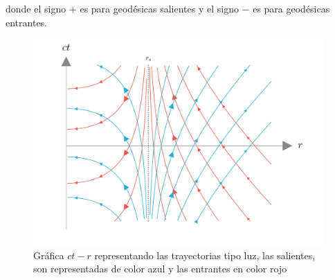 donde el signo $+$ es para geodésicas salientes y el signo $-$ es para geodésicas entrantes.
\begin{figure}[H]
    \begin{small}
        \begin{center}
            \includegraphics[width=0.99\textwidth]{AgujerosNegros/Schwarzschild/media/images/rayos_Luz_Schwarzschild_ManimCE_v0.19.0.png}
        \end{center}
        \caption{Gráfica $ct-r $ representando las trayectorias tipo luz, las salientes, son representadas de color azul y las entrantes en color rojo }
        \label{fig:lightraysSchwarzschild}
    \end{small}
\end{figure}

